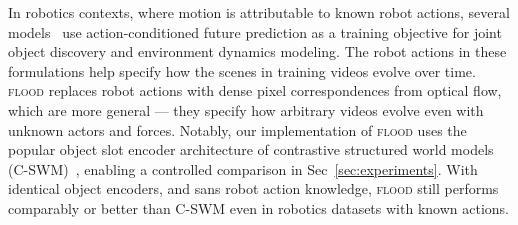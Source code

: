 \documentclass{article}
\newcommand{\jd}[1]{\textcolor{orange}{[DJ: #1]}}
\begin{document}
In robotics contexts, where motion is attributable to known robot actions, several models~\cite{kipf2019contrastive, kipf2018neural, Veerapaneni2019EntityAI} 
use action-conditioned future prediction as a training objective for joint object discovery and environment dynamics modeling. The robot actions in these formulations help specify how the scenes in training videos evolve over time. \textsc{flood} replaces robot actions with dense pixel correspondences from optical flow, which are more general --- they specify how arbitrary videos evolve even with unknown actors and forces. Notably, our implementation of \textsc{flood} uses the popular object slot encoder architecture of contrastive structured world models (C-SWM)~\cite{kipf2019contrastive}, enabling a controlled comparison in Sec~\ref{sec:experiments}. With identical object encoders, and sans robot action knowledge, \textsc{flood} still performs comparably or better than C-SWM even in robotics datasets with known actions.





    
    
    
    
\end{document}
